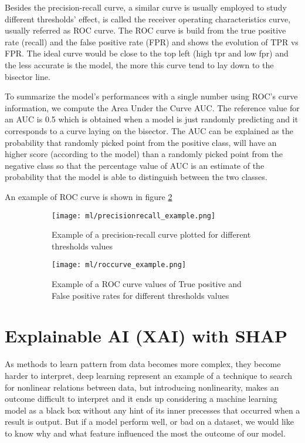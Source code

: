 \documentclass[12pt]{report}
\begin{document}
Besides the precision-recall curve, a similar curve is usually employed to study different thresholds' effect, is called the receiver operating characteristics curve, usually referred as ROC curve.
The ROC curve is build from the true positive rate (recall) and the false positive rate (FPR) and shows the evolution of TPR vs FPR.
The ideal curve would be close to the top left (high tpr and low fpr) and the less accurate is the model, the more this curve tend to lay down to the bisector line.

To summarize the model's performances with a single number using ROC's curve information, we compute the Area Under the Curve AUC.
The reference value for an AUC is 0.5 which is obtained when a model is just randomly predicting and it corresponds to a curve laying on the bisector.
The AUC can be explained as the probability that randomly picked point from the positive class, will have an higher score (according to the model) than a randomly picked point from the negative class so that the percentage value of AUC is an estimate of the probability that the model is able to distinguish between the two classes.

An example of ROC curve is shown in figure \ref{fig:roccurve}


\begin{figure}
\centering
\begin{subfigure}{0.4\textwidth}
\texttt{[image: ml/precisionrecall\_example.png]}
\caption{Example of a precision-recall curve plotted for different thresholds values}
\label{fig:precisionrecall}
\end{subfigure}
\begin{subfigure}{0.4\textwidth}
\texttt{[image: ml/roccurve\_example.png]}
\caption{Example of a ROC curve values of True positive and False positive rates for different thresholds values}
\label{fig:roccurve}
\end{subfigure}
\caption{}
\label{}
\end{figure}



\chapter{Explainable AI (XAI) with SHAP}

As methods to learn pattern from data becomes more complex, they become harder to interpret, deep learning represent an example of a technique to search for nonlinear relations between data, but introducing nonlinearity, makes an outcome difficult to interpret and it ends up considering a machine learning model as a black box without any hint of its inner precesses that occurred when a result is output. But if a model perform well, or bad on a dataset, we would like to know why and what feature influenced the most the outcome of our model.
\end{document}
